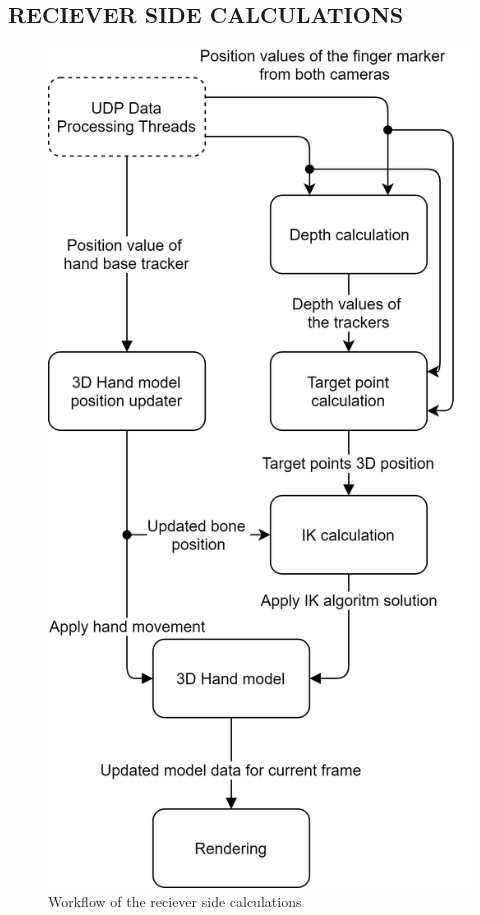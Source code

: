 \subsection{RECIEVER SIDE CALCULATIONS}
\begin{figure}[ht]
\label{fig:reciever_side_calculations} 
\centering
	\includegraphics[width=\columnwidth/2]{images/Rendering_workflow.png}
	\caption{Workflow of the reciever side calculations}
\end{figure}
